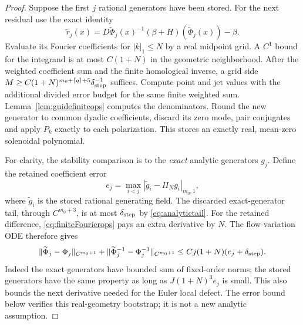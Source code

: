 \documentclass[11pt,a4paper]{amsart}
\theoremstyle{definition}
\theoremstyle{remark}
\numberwithin{equation}{section}
\newcommand{\norm}[1]{\lVert #1\rVert}
\begin{document}
\begin{proof}
Suppose the first $j$ rational generators have been stored. For the next residual use the exact identity
\begin{equation}\label{eq:residualevaluation}
 \widetilde r_j(x)=
 D\widetilde\Phi_j(x)^{-1}(\beta+H)(\widetilde\Phi_j(x))-\beta.
\end{equation}
Evaluate its Fourier coefficients for $|k|_1\le N$ by a real midpoint grid. A $C^1$ bound for the integrand is at most $C(1+N)$ in the geometric neighborhood. After the weighted coefficient sum and the finite homological inverse, a grid side
$M\ge C(1+N)^{m_0+\lceil q\rceil+5}\delta_{\rm step}^{-1}$
suffices. Compute point and jet values with the additional divided error budget for the same finite weighted sum. Lemma~\ref{lem:guidefiniteops} computes the denominators. Round the new generator to common dyadic coefficients, discard its zero mode, pair conjugates and apply $P_k$ exactly to each polarization. This stores an exactly real, mean-zero solenoidal polynomial.

For clarity, the stability comparison is to the \emph{exact} analytic generators $g_j$. Define the retained coefficient error
\[
 e_j=\max_{i<j}|\widetilde g_i-\Pi_Ng_i|_{m_0,1},
\]
where $\widetilde g_i$ is the stored rational generating field. The discarded exact-generator tail, through $C^{m_0+3}$, is at most $\delta_{\rm step}$ by \eqref{eq:analytictail}. For the retained difference, \eqref{eq:finiteFourierops} pays an extra derivative by $N$. The flow-variation ODE therefore gives
\begin{equation}\label{eq:prefixcomparison}
 \norm{\widetilde\Phi_j-\Phi_j}_{C^{m_0+1}}
 +\norm{\widetilde\Phi_j^{-1}-\Phi_j^{-1}}_{C^{m_0+1}}
 \le Cj(1+N)(e_j+\delta_{\rm step}).
\end{equation}
Indeed the exact generators have bounded sum of fixed-order norms; the stored generators have the same property as long as
$J(1+N)^3 e_j$ is small. This also bounds the next derivative needed for the Euler local defect. The error bound below verifies this real-geometry bootstrap; it is not a new analytic assumption.


\end{proof}
\end{document}
